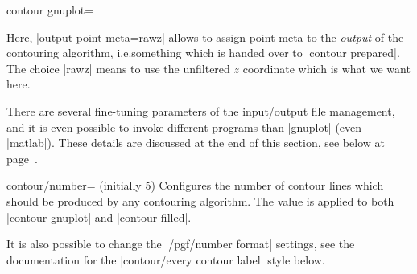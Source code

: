 {{\begin{plottype}[/pgfplots]{
    contour gnuplot=\textcolor{black}{}%
}
\pgfplotsexpensiveexample
\begin{codeexample}[]
\end{codeexample}

    Here, |output point meta=rawz| allows to assign point meta to the
    \emph{output} of the contouring algorithm, i.e.\@ something which is handed
    over to |contour prepared|. The choice |rawz| means to use the unfiltered
    $z$ coordinate which is what we want here.

    There are several fine-tuning parameters of the input/output file
    management, and it is even possible to invoke different programs than
    |gnuplot| (even |matlab|). These details are discussed at the end of this
    section, see below at page~\pageref{key:pgfplots:contour:gnuplot}.
\end{plottype}

\begin{pgfplotskey}{contour/number= (initially 5)}
    Configures the number of contour lines which should be produced by any
    contouring algorithm. The value is applied to both |contour gnuplot| and
    |contour filled|.
\pgfplotsexpensiveexample
\begin{codeexample}[]
\end{codeexample}
    It is also possible to change the |/pgf/number format| settings, see the
    documentation for the |contour/every contour label| style below.


\end{pgfplotskey}}}
